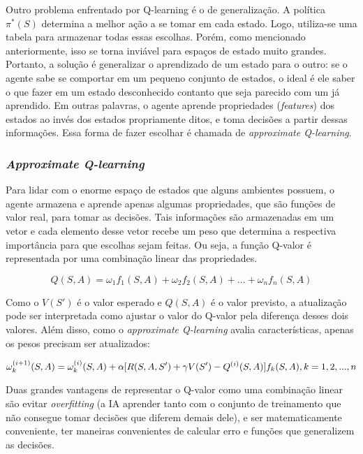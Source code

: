 Outro problema enfrentado por Q-learning é o de generalização. A política $\pi^{*}(S)$ determina a melhor ação a se tomar em cada estado. Logo, utiliza-se uma tabela para armazenar todas essas escolhas. Porém, como mencionado anteriormente, isso se torna inviável para espaços de estado muito grandes. Portanto, a solução é generalizar o aprendizado de um estado para o outro: se o agente sabe se comportar em um pequeno conjunto de estados, o ideal é ele saber o que fazer em um estado desconhecido contanto que seja parecido com um já aprendido. Em outras palavras, o agente aprende propriedades (\textit{features}) dos estados ao invés dos estados propriamente ditos, e toma decisões a partir dessas informações. Essa forma de fazer escolhar é chamada de \textit{approximate Q-learning}.

\subsubsection{\textit{Approximate Q-learning}}
\label{sec:aql}

Para lidar com o enorme espaço de estados que alguns ambientes possuem, o agente armazena e aprende apenas algumas propriedades, que são funções de valor real, para tomar as decisões. Tais informações são armazenadas em um vetor e cada elemento desse vetor recebe um peso que determina a respectiva importância para que escolhas sejam feitas. Ou seja, a função Q-valor é representada por uma combinação linear das propriedades.

\begin{equation} \label{eq:q_lin_comb}
Q(S,A) = \omega_{1}f_{1}(S,A) + \omega_{2}f_{2}(S,A) + ... + \omega_{n}f_{n}(S,A)
\end{equation}

Como o $V(S')$ é o valor esperado e $Q(S,A)$ é o valor previsto, a atualização pode ser interpretada como ajustar o valor do Q-valor pela diferença desses dois valores. Além disso, como o \textit{approximate Q-learning} avalia características, apenas os pesos precisam ser atualizados:

\begin{equation} \label{eq:w_update}
\omega_{k}^{(i+1)}(S,A) = \omega_{k}^{(i)}(S,A) + \alpha[R(S,A,S') + \gamma V(S') - Q^{(i)}(S,A)]f_{k}(S,A), \hfill k = 1, 2, ..., n
\end{equation}

Duas grandes vantagens de representar o Q-valor como uma combinação linear são evitar \textit{overfitting} (a IA aprender tanto com o conjunto de treinamento que não consegue tomar decisões que diferem demais dele), e ser matematicamente conveniente, ter maneiras convenientes de calcular erro e funções que generalizem as decisões.

